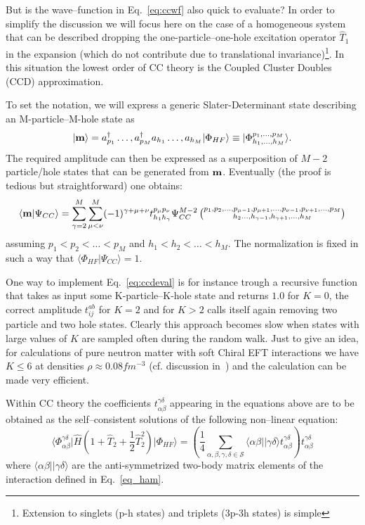 But is the wave--function in Eq.~\eqref{eq:ccwf} also quick to evaluate?
In order to simplify the discussion we will focus here on the case of a homogeneous system 
that can be described dropping the one-particle--one-hole excitation operator $\hat{T}_1$ in 
the expansion (which do not contribute due to translational invariance)\footnote{Extension to singlets (p-h states) and triplets (3p-3h states) is simple}. 
In this situation the lowest order of CC theory is the Coupled Cluster Doubles (CCD) approximation.

To set the notation, we will express a generic Slater-Determinant state describing an M-particle--M-hole state as
\begin{equation}
\rvert {\bf m}\rangle= a^\dagger_{p_1}\dots,a^\dagger_{p_M}a_{h_1}\dots,a_{h_M} \vert \Phi_{HF} \rangle \equiv \; \rvert \Phi^{p_1,\dots,p_M}_{h_1,\dots,h_M} \rangle.
\end{equation}
The required amplitude can then be expressed as a superposition of $M-2$ particle/hole states
that can be generated from ${\bf m}$. Eventually (the proof is tedious but straightforward) one obtains:
\begin{equation}
\label{eq:ccdeval}
\langle {\bf m}\vert \Psi_{CC}\rangle = \sum_{\gamma=2}^M\sum_{\mu<\nu}^M (-1)^{\gamma+\mu+\nu}t^{p_\mu p_\nu}_{h_1 h_\gamma}\Psi_{CC}^{M-2}\left(\substack{p_1,p_2,\dots,p_{\mu-1},p_{\mu+1},\dots,p_{\nu-1},p_{\nu+1},\dots,p_M\\ h_2\dots,h_{\gamma-1},h_{\gamma+1},\dots,h_M}\right)
\end{equation}
assuming $p_1<p_2<\dots<p_M$ and $h_1<h_2<\dots<h_M$. The normalization is fixed in such a way that $\langle \Phi_{HF}\vert \Psi_{CC}\rangle = 1$.

One way to implement Eq.~\eqref{eq:ccdeval} is for instance trough a recursive function that takes as input some K-particle--K-hole state and 
returns $1.0$ for $K=0$, the correct amplitude $t_{ij}^{ab}$ for $K=2$ and for $K>2$ calls itself again removing two particle and two hole states.
Clearly this approach becomes slow when states with large values of $K$ are sampled often during the random walk. Just to give an idea, for
calculations of pure neutron matter with soft Chiral EFT interactions we have $K\leq6$ at densities $\rho\approx0.08 fm^{-3}$ (cf. discussion in~\cite{Rrapaj16})
and the calculation can be made very efficient.

Within CC theory the coefficients $t_{\alpha\beta}^{\gamma\delta}$ appearing in the equations above are to be obtained as the self--consistent solutions
of the following non--linear equation:
\begin{equation}
\label{eq_CCD}
\langle \Phi^{\gamma\delta}_{\alpha\beta} \lvert \hat{H} \left( 1+\hat{T}_2+\frac{1}{2}\hat{T}^2_2\right) \rvert\Phi_{HF} \rangle= \left( \frac{1}{4}\sum_{\alpha,\beta,\gamma,\delta \in \mathcal{S}} \langle \alpha\beta\lvert\rvert \gamma\delta\rangle t_{\alpha\beta}^{\gamma\delta}\right) t_{\alpha\beta}^{\gamma\delta}
\end{equation}
where $\langle \alpha\beta\lvert\rvert \gamma\delta\rangle$ are the anti-symmetrized two-body matrix elements of the interaction defined in Eq.~\eqref{eq_ham}.

